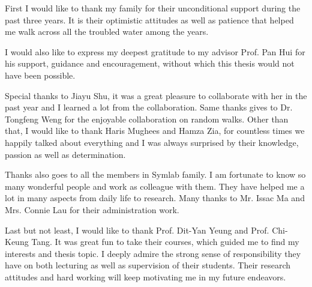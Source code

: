 \acknowledgments

First I would like to thank my family for their unconditional support during the past three years. It is their optimistic attitudes as well as patience that helped me walk across all the troubled water among the years.

I would also like to express my deepest gratitude to my advisor Prof. Pan Hui for his support, guidance and encouragement, without which this thesis would not have been possible.

Special thanks to Jiayu Shu, it was a great pleasure to collaborate with her in the past year and I learned a lot from the collaboration. Same thanks gives to Dr. Tongfeng Weng for the enjoyable collaboration on random walks. Other than that, I would like to thank Haris Mughees and Hamza Zia, for countless times we happily talked about everything and I was always surprised by their knowledge, passion as well as determination.

Thanks also goes to all the members in Symlab family. I am fortunate to know so many wonderful people and work as colleague with them. They have helped me a lot in many aspects from daily life to research. Many thanks to Mr. Issac Ma and Mrs. Connie Lau for their administration work.

Last but not least, I would like to thank Prof. Dit-Yan Yeung and Prof. Chi-Keung Tang. It was great fun to take their courses, which guided me to find my interests and thesis topic. I deeply admire the strong sense of responsibility they have on both lecturing as well as supervision of their students. Their research attitudes and hard working will keep motivating me in my future endeavors.

\endacknowledgments
